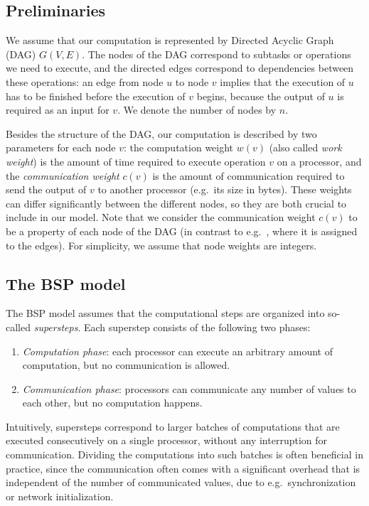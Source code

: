 \documentclass[sigconf,nonacm]{acmart}
\begin{document}
\subsection{Preliminaries}

We assume that our computation is represented by Directed Acyclic Graph (DAG) $G(V, E)$. The nodes of the DAG correspond to subtasks or operations we need to execute, and the directed edges correspond to dependencies between these operations: an edge from node $u$ to node $v$ implies that the execution of $u$ has to be finished before the execution of $v$ begins, because the output of $u$ is required as an input for $v$. We denote the number of nodes by $n$.

Besides the structure of the DAG, our computation is described by two parameters for each node $v$: the computation weight $w(v)$ (also called \emph{work weight}) is the amount of time required to execute operation $v$ on a processor, and the \emph{communication weight} $c(v)$ is the amount of communication required to send the output of $v$ to another processor (e.g.\ its size in bytes). These weights can differ significantly between the different nodes, so they are both crucial to include in our model. Note that we consider the communication weight $c(v)$ to be a property of each node of the DAG (in contrast to e.g.\ \cite{SPD}, where it is assigned to the edges). For simplicity, we assume that node weights are integers.

\subsection{The BSP model} The BSP model assumes that the computational steps are organized into so-called \emph{supersteps}. Each superstep consists of the following two phases:
\begin{enumerate}[topsep=4pt,itemsep=0pt,partopsep=2pt,parsep=5pt]
    \item \textit{Computation phase}: each processor can execute an arbitrary amount of computation, but no communication is allowed. 
    \item \textit{Communication phase}: processors can communicate any number of values to each other, but no computation happens.
\end{enumerate}

Intuitively, supersteps correspond to larger batches of computations that are executed consecutively on a single processor, without any interruption for communication. Dividing the computations into such batches is often beneficial in practice, since the communication often comes with a significant overhead that is independent of the number of communicated values, due to e.g.\ synchronization or network initialization.
\end{document}
